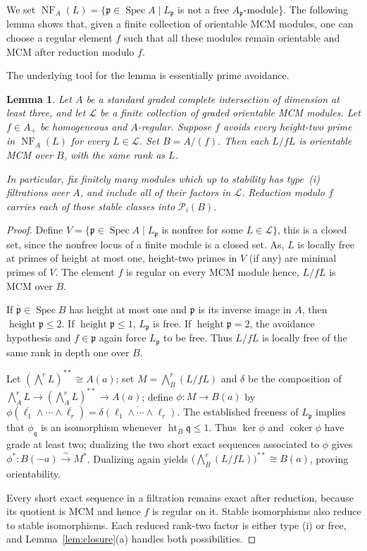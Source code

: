 \documentclass[11pt,letterpaper]{amsart}
\newcommand{\x}{\xrightarrow{}}
\DeclareMathOperator{\Spec}{Spec}
\DeclareMathOperator{\height}{height}
\theoremstyle{plain}
\newtheorem{lem}[thm]{Lemma}
\theoremstyle{definition}
\theoremstyle{remark}
\begin{document}
We set $\operatorname{NF}_A(L)=\{\mathfrak p\in\Spec A\mid L_\mathfrak p$ is not a free $A_\mathfrak p$-module\}. The following lemma shows that, given a finite collection of orientable MCM modules, one can choose a regular element \(f\) such that all these modules remain orientable and MCM after reduction modulo \(f\). %

The underlying tool for the lemma is essentially prime avoidance. 

\begin{lem}\label{lem:specialize}
Let $A$ be a standard graded complete intersection of dimension at
least three, and let $\mathcal L$ be a finite collection of graded orientable
MCM modules. Let $f\in A_+$ be homogeneous and $A$-regular. Suppose
$f$ avoids every height-two prime in $\operatorname{NF}_A(L)$ for every
$L\in\mathcal L$. Set $B=A/(f)$. Then each $L/fL$ is orientable
MCM over $B$, with the same rank as $L$.

In particular, fix finitely many modules which up to stability has type~(i) filtrations over $A$, and include all of their factors in $\mathcal L$. Reduction modulo
$f$ carries each of those stable classes into $\mathcal{P}_{i}(B)$.
\end{lem}

\begin{proof} Define $V=\{\mathfrak p\in\Spec A\mid L_\mathfrak p$ is nonfree for some $L\in\mathcal{L}\}$, this is a closed set, since the nonfree locus of a finite module is a closed set. As, $L$ is locally
free at primes of height at most one, height-two primes in $V$ (if any)
are minimal primes of $V$. %
The element $f$ is regular on every MCM module hence, $L/fL$ is MCM over $B$.

If $\overline{\mathfrak p}\in\Spec B$ has height at most one and $\mathfrak p$ is its
inverse image in $A$, then $\height \mathfrak p\leq2$.
If $\height \mathfrak p\leq1$, $L_\mathfrak p$ is free. If $\height\mathfrak p=2$, the
avoidance hypothesis and $f\in\mathfrak p$ again force $L_\mathfrak p$ to be free. Thus $L/fL$
is locally free of the same rank in depth one over $B$.

Let $(\bigwedge^rL)^{**}\cong A(a)$; set $M=\bigwedge_B^r(L/fL)$ and $\delta$ be the composition of $\bigwedge_A^rL\x (\bigwedge_A^rL)^{**}\x A(a)$; define $\phi:M\x B(a)$ by $\phi(\overline{\ell_1}\wedge\cdots\wedge\overline{\ell_r})=\overline{\delta(\ell_1\wedge\cdots\wedge\ell_r)}$.
The established freeness of $L_{\mathfrak p}$ implies that $\phi_{\mathfrak q}$ is an isomorphism whenever $\operatorname{ht}_B\mathfrak q\le1$.
Thus $\ker\phi$ and $\operatorname{coker}\phi$ have grade at least two; dualizing the two short exact sequences associated to $\phi$ gives $\phi^*:B(-a)\xrightarrow{\sim}M^*$.
Dualizing again yields $\bigl(\bigwedge_B^r(L/fL)\bigr)^{**}\cong B(a)$, proving orientability.

Every short exact sequence in a filtration remains exact after reduction, because its quotient is MCM and hence $f$ is regular on it. Stable isomorphisms also reduce to stable isomorphisms. Each reduced rank-two factor is either type (i) or free, and
Lemma~\ref{lem:closure}(a) handles both possibilities.
\end{proof}
\end{document}
